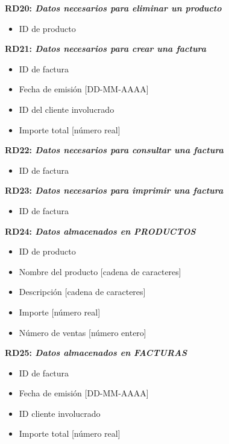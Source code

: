 \documentclass[paper=a4, fontsize=11pt, spanish]{scrartcl}
\begin{document}
	\setlength{\parindent}{0em}
	\textbf{RD20: \textit{Datos necesarios para eliminar un producto}}
	\setlength{\parindent}{2em}
	\begin{itemize}
		\item ID de producto
	\end{itemize}
	
	\setlength{\parindent}{0em}
	\textbf{RD21: \textit{Datos necesarios para crear una factura}}
	\setlength{\parindent}{2em}
	\begin{itemize}
		\item ID de factura
		\item Fecha de emisión [DD-MM-AAAA]
		\item ID del cliente involucrado
		\item Importe total [número real]
	\end{itemize}
	
	\setlength{\parindent}{0em}
	\textbf{RD22: \textit{Datos necesarios para consultar una factura}}
	\setlength{\parindent}{2em}
	\begin{itemize}
		\item ID de factura
	\end{itemize}
	
	\setlength{\parindent}{0em}
	\textbf{RD23: \textit{Datos necesarios para imprimir una factura}}
	\setlength{\parindent}{2em}
	\begin{itemize}
		\item ID de factura
	\end{itemize}
	
	\setlength{\parindent}{0em}
	\textbf{RD24: \textit{Datos almacenados en PRODUCTOS}}
	\setlength{\parindent}{2em}
	\begin{itemize}
		\item ID de producto
		\item Nombre del producto [cadena de caracteres]
		\item Descripción [cadena de caracteres]
		\item Importe [número real]
		\item Número de ventas [número entero]
	\end{itemize}
	
	\setlength{\parindent}{0em}
	\textbf{RD25: \textit{Datos almacenados en FACTURAS}}
	\setlength{\parindent}{2em}
	\begin{itemize}
		\item ID de factura
		\item Fecha de emisión [DD-MM-AAAA]
		\item ID cliente involucrado
		\item Importe total [número real]
	\end{itemize}
	
\end{document}
